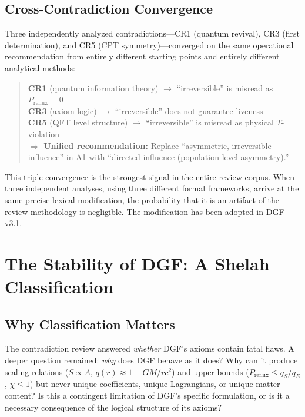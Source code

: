 \documentclass[12pt,a4paper]{article}
\theoremstyle{definition}
\theoremstyle{remark}
\begin{document}
\subsection{Cross-Contradiction Convergence}

Three independently analyzed contradictions---CR1 (quantum revival), CR3 (first determination), and CR5 (CPT symmetry)---converged on the same operational recommendation from entirely different starting points and entirely different analytical methods:

\begin{quote}
\textbf{CR1} (quantum information theory) $\to$ ``irreversible'' is misread as $P_{\mathrm{reflux}}=0$ \\
\textbf{CR3} (axiom logic) $\to$ ``irreversible'' does not guarantee liveness \\
\textbf{CR5} (QFT level structure) $\to$ ``irreversible'' is misread as physical $T$-violation \\
$\Rightarrow$ \textbf{Unified recommendation:} Replace ``asymmetric, irreversible influence'' in A1 with ``directed influence (population-level asymmetry).''
\end{quote}

This triple convergence is the strongest signal in the entire review corpus. When three independent analyses, using three different formal frameworks, arrive at the same precise lexical modification, the probability that it is an artifact of the review methodology is negligible. The modification has been adopted in DGF v3.1.

\section{The Stability of DGF: A Shelah Classification}
\label{sec:shelah}

\subsection{Why Classification Matters}

The contradiction review answered \emph{whether} DGF's axioms contain fatal flaws. A deeper question remained: \emph{why} does DGF behave as it does? Why can it produce scaling relations ($S \propto A$, $q(r) \approx 1-GM/rc^2$) and upper bounds ($P_{\mathrm{reflux}} \leq q_S/q_E$, $\chi \leq 1$) but never unique coefficients, unique Lagrangians, or unique matter content? Is this a contingent limitation of DGF's specific formulation, or is it a necessary consequence of the logical structure of its axioms?
\end{document}
